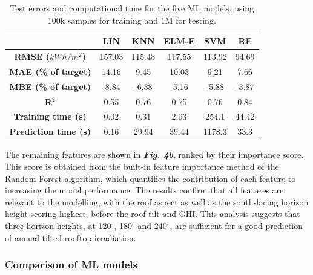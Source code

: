 \begin{table}[tb]
\centering
\footnotesize
\begin{tabular}{cccccc}
\hline
\textbf{}                    & \textbf{LIN} & \textbf{KNN} & \textbf{ELM-E} & \textbf{SVM} & \textbf{RF} \\ \hline
\textbf{RMSE ($kWh/m^2$)}       & 157.03       & 115.48       & 117.55         & 113.92       & 94.69       \\
\textbf{MAE (\% of target)}  & 14.16        & 9.45         & 10.03          & 9.21         & 7.66        \\
\textbf{MBE (\% of target)}  & -8.84        & -6.38        & -5.16          & -5.88        & -3.87       \\
\textbf{R$^2$}                  & 0.55         & 0.76         & 0.75           & 0.76         & 0.84        \\
\textbf{Training time (s)}   & 0.02         & 0.31         & 2.03           & 254.1        & 44.42       \\
\textbf{Prediction time (s)} & 0.16         & 29.94        & 39.44          & 1178.3       & 33.3        \\ \hline
\end{tabular}
\caption{Test errors and computational time for the five ML models, using 100k samples for training and 1M for testing.}
\label{tab:chile_results}
\end{table}

The remaining features are shown in \textbf{\textit{Fig. 4b}}, ranked by their importance score. This score is obtained from the built-in feature importance method of the Random Forest algorithm, which quantifies the contribution of each feature to increasing the model performance. The results confirm that all features are relevant to the modelling, with the roof aspect as well as the south-facing horizon height scoring highest, before the roof tilt and GHI. This analysis suggests that three horizon heights, at 120$^\circ$, 180$^\circ$ and 240$^\circ$, are sufficient for a good prediction of annual tilted rooftop irradiation.

\subsubsection{Comparison of ML models}

